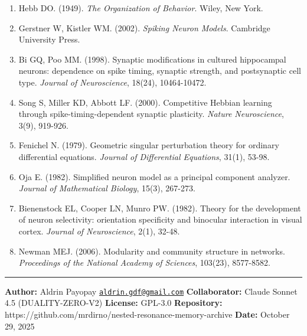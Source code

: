 \documentclass[
]{article}
\begin{document}
\begin{enumerate}
\def\labelenumi{\arabic{enumi}.}
\item
  Hebb DO. (1949). \emph{The Organization of Behavior}. Wiley, New York.
\item
  Gerstner W, Kistler WM. (2002). \emph{Spiking Neuron Models}.
  Cambridge University Press.
\item
  Bi GQ, Poo MM. (1998). Synaptic modifications in cultured hippocampal
  neurons: dependence on spike timing, synaptic strength, and
  postsynaptic cell type. \emph{Journal of Neuroscience}, 18(24),
  10464-10472.
\item
  Song S, Miller KD, Abbott LF. (2000). Competitive Hebbian learning
  through spike-timing-dependent synaptic plasticity. \emph{Nature
  Neuroscience}, 3(9), 919-926.
\item
  Fenichel N. (1979). Geometric singular perturbation theory for
  ordinary differential equations. \emph{Journal of Differential
  Equations}, 31(1), 53-98.
\item
  Oja E. (1982). Simplified neuron model as a principal component
  analyzer. \emph{Journal of Mathematical Biology}, 15(3), 267-273.
\item
  Bienenstock EL, Cooper LN, Munro PW. (1982). Theory for the
  development of neuron selectivity: orientation specificity and
  binocular interaction in visual cortex. \emph{Journal of
  Neuroscience}, 2(1), 32-48.
\item
  Newman MEJ. (2006). Modularity and community structure in networks.
  \emph{Proceedings of the National Academy of Sciences}, 103(23),
  8577-8582.
\end{enumerate}

\begin{center}\rule{0.5\linewidth}{0.5pt}\end{center}

\textbf{Author:} Aldrin Payopay
\href{mailto:aldrin.gdf@gmail.com}{\nolinkurl{aldrin.gdf@gmail.com}}
\textbf{Collaborator:} Claude Sonnet 4.5 (DUALITY-ZERO-V2)
\textbf{License:} GPL-3.0 \textbf{Repository:}
https://github.com/mrdirno/nested-resonance-memory-archive
\textbf{Date:} October 29, 2025
\end{document}

